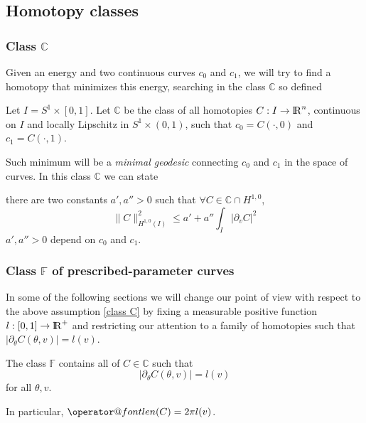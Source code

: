 \documentclass[twoside,a4paper,english]{article}
\makeatletter
\def\derpar#1{\partial_{#1}}
\def\len{\mathop{\operator@font len}\nolimits}
\makeatother
\begin{document}
\subsection{Homotopy classes}

\newcommand\C{\mathbb C}
\subsubsection{Class $\C$}
Given an energy and two continuous curves $c_0$ and $c_1$,
we will try to find a homotopy that
minimizes this energy, searching  in the class $\C$
so defined

\begin{Definition}[class $\C$]
\label{class C}
  Let $I=S^1\times [0,1]$. Let $\C$ be the class of all homotopies
  $C:I\to{\protect\mathrm{l\hskip-0.15em R}}^n$, continuous on $I$ and
  locally Lipschitz in $S^1\times(0,1)$, such that
  $c_0=C(\cdot, 0)$ and $c_1=C(\cdot, 1)$.
\end{Definition}
Such minimum will be a \emph{minimal geodesic} 
connecting $c_0$ and $c_1$ in the space of curves.
In this class $\C$ we can state 
\begin{Proposition}
  \label{poincare}
  there are two constants $a',a''>0$ such that $\forall C\in\C\cap H^{1,0}$,
  \begin{equation}\label{eq: poincare}
    \| C  \|_{H^{1,0}(I)} ^2\le a'+ a'' \int_I | \derpar v C | ^2   
  \end{equation}
  $a',a''>0$ depend on $c_0$ and $c_1$.
\end{Proposition}


\def\F{{\mathbb F}}
\subsubsection{Class $\F$ of prescribed-parameter curves}


In some of the following sections we will
change our point of view with respect to the above  assumption \ref{class C}
by fixing a measurable positive function $l:[0,1]\to {\protect\mathrm{l\hskip-0.15em R}}^+$
and restricting our attention
to a family of homotopies such that $|\derpar \theta C(\theta,v)| =l(v) $.

\begin{Definition}[class $\F$]\label{class F}
  The class $\F$ contains all  of $C\in \C$ such that
  \[|\derpar \theta C(\theta,v)| =l(v)\] for all $\theta,v$.
\end{Definition}
In particular, $ \len(C)=2\pi l(v)$.
\end{document}
